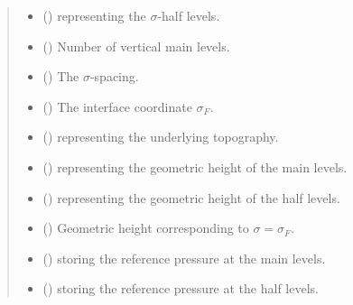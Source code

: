 \documentclass[letterpaper,10pt,english]{sphinxmanual}
\begin{document}
\begin{fulllineitems}
\begin{quote}
\begin{description}
\begin{itemize}
\item {} 
 () \textendash{} {\hyperref[\detokenize{api:grids.axis.Axis}]{}} representing the \(\sigma\)-half levels.

\item {} 
 () \textendash{} Number of vertical main levels.

\item {} 
 () \textendash{} The \(\sigma\)-spacing.

\item {} 
 () \textendash{} The interface coordinate \(\sigma_F\).

\item {} 
{\hyperref[\detokenize{api:module-grids.topography}]{}} () \textendash{}  representing the underlying topography.

\item {} 
 () \textendash{}  representing the geometric height of the main levels.

\item {} 
 () \textendash{}  representing the geometric height of the half levels.

\item {} 
 () \textendash{} Geometric height corresponding to \(\sigma = \sigma_F\).

\item {} 
 () \textendash{}  storing the reference pressure at the main levels.

\item {} 
 () \textendash{}  storing the reference pressure at the half levels.


\end{itemize}
\end{description}
\end{quote}
\end{fulllineitems}
\end{document}
